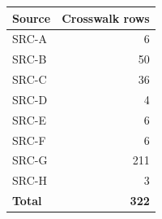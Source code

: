 \begin{tabular}{@{}lr@{}}
\toprule
\textbf{Source} & \textbf{Crosswalk rows}\\
\midrule
SRC-A & 6\\
SRC-B & 50\\
SRC-C & 36\\
SRC-D & 4\\
SRC-E & 6\\
SRC-F & 6\\
SRC-G & 211\\
SRC-H & 3\\
\midrule
\textbf{Total} & \textbf{322}\\
\bottomrule
\end{tabular}